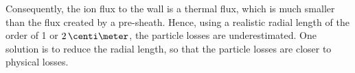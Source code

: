 Consequently, the ion flux to the wall is a thermal flux, which is much smaller than the flux created by a pre-sheath.
Hence, using a realistic radial length  of the order of 1 or $2\,\centi\meter$, the particle losses are underestimated.
One solution is to reduce the radial length, so that the particle losses are closer to physical losses.

